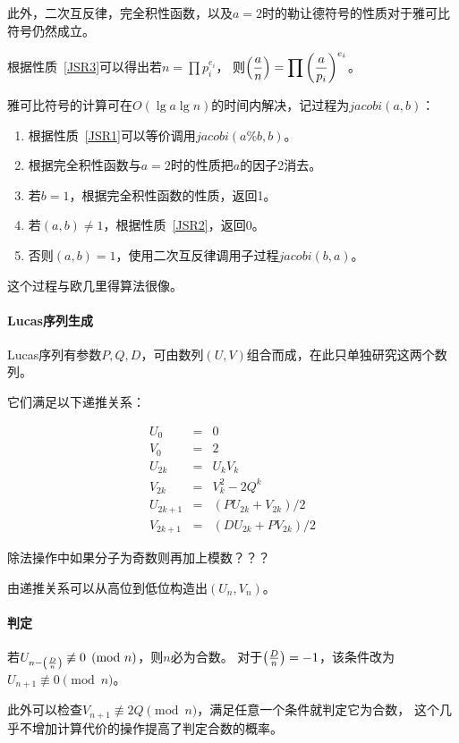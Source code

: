 此外，二次互反律，完全积性函数，以及$a=2$时的勒让德符号的性质对于雅可比符号仍然成立。

根据性质~\ref{JSR3}可以得出若$\displaystyle n=\prod{p_i^{e_i}}$，
则$\displaystyle \left(\frac{a}{n}\right)=\prod{\left(\frac{a}{p_i}\right)^{e_i}}$。

雅可比符号的计算可在$O(\lg a\lg n)$的时间内解决，记过程为$jacobi(a,b)$：

\begin{enumerate}
    \item 根据性质~\ref{JSR1}可以等价调用$jacobi(a\%b,b)$。
    \item 根据完全积性函数与$a=2$时的性质把$a$的因子2消去。
    \item 若$b=1$，根据完全积性函数的性质，返回1。
    \item 若$(a,b)\neq 1$，根据性质~\ref{JSR2}，返回0。
    \item 否则$(a,b)=1$，使用二次互反律调用子过程$jacobi(b,a)$。
\end{enumerate}

这个过程与欧几里得算法很像。

\paragraph{Lucas序列生成}
Lucas序列有参数$P,Q,D$，可由数列$(U,V)$组合而成，在此只单独研究这两个数列。

它们满足以下递推关系：

\begin{eqnarray*}
    U_0&=&0\\
    V_0&=&2\\
    U_{2k}&=&U_kV_k\\
    V_{2k}&=&V_k^2-2Q^k\\
    U_{2k+1}&=&(PU_{2k}+V_{2k})/2\\
    V_{2k+1}&=&(DU_{2k}+PV_{2k})/2
\end{eqnarray*}

除法操作中如果分子为奇数则再加上模数？？？

由递推关系可以从高位到低位构造出$(U_n,V_n)$。

\paragraph{判定}
若$U_{n-\left(\frac{D}{n}\right)}\not \equiv 0\pmod{n}$，则$n$必为合数。
对于$\left(\frac{D}{n}\right)=-1$，该条件改为$U_{n+1}\not \equiv 0\pmod{n}$。

此外可以检查$V_{n+1}\not \equiv 2Q \pmod{n}$，满足任意一个条件就判定它为合数，
这个几乎不增加计算代价的操作提高了判定合数的概率。
